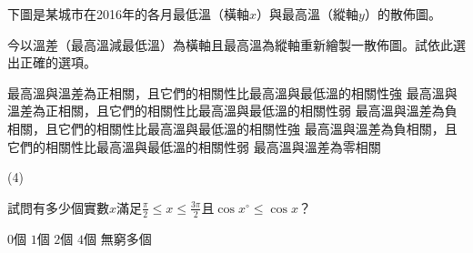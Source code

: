 \begin{QUESTION}
    \begin{QBODY}
        下圖是某城市在2016年的各月最低溫（橫軸$x$）與最高溫（縱軸$y$）的散佈圖。
        
        今以溫差（最高溫減最低溫）為橫軸且最高溫為縱軸重新繪製一散佈圖。試依此選出正確的選項。
        \begin{QOPS}
            \QOP 最高溫與溫差為正相關，且它們的相關性比最高溫與最低溫的相關性強
            \QOP 最高溫與溫差為正相關，且它們的相關性比最高溫與最低溫的相關性弱
            \QOP 最高溫與溫差為負相關，且它們的相關性比最高溫與最低溫的相關性強
            \QOP 最高溫與溫差為負相關，且它們的相關性比最高溫與最低溫的相關性弱
            \QOP 最高溫與溫差為零相關
        \end{QOPS}
        
    \end{QBODY}
    \begin{QFROMS}
    \end{QFROMS}
    \begin{QTAGS}
    \end{QTAGS}
    \begin{QANS}
        (4)
    \end{QANS}
    \begin{QSOL}
    \end{QSOL}
    \begin{QEMPTYSPACE}
    \end{QEMPTYSPACE}
\end{QUESTION}
\begin{QUESTION}
    \begin{QBODY}
        試問有多少個實數$x$滿足$\frac{\pi }{2}\le x\le \frac{3\pi }{2}$且$\cos x{}^\circ \le \cos x$？
        \begin{QOPS}
            \QOP $0$個     
            \QOP $1$個     
            \QOP $2$個     
            \QOP $4$個     
            \QOP 無窮多個
        \end{QOPS}
    \end{QBODY}
    \begin{QFROMS}
    \end{QFROMS}
    \begin{QTAGS}
    \end{QTAGS}
    \begin{QANS}
    \end{QANS}
    \begin{QSOL}
    \end{QSOL}
    \begin{QEMPTYSPACE}
    \end{QEMPTYSPACE}
\end{QUESTION}
